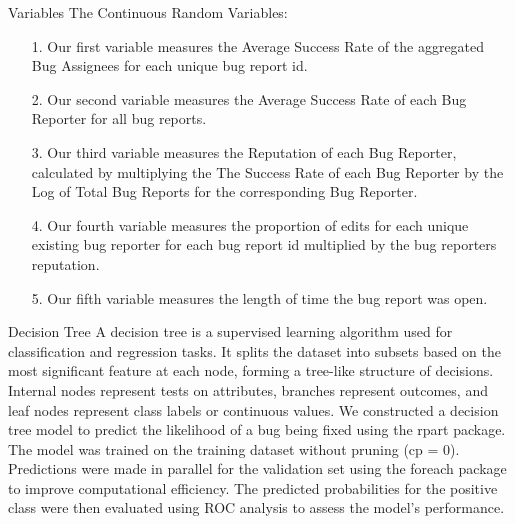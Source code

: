 \documentclass[10pt]{beamer}
\begin{document}
\begin{frame}[t]{Variables} \justifying \vspace{25pt}
	The Continuous Random Variables:
	\begin{enumerate}
	\item [1.] Our first variable measures the Average Success Rate of the aggregated Bug Assignees for each unique bug report id.
	\item [2.] Our second variable measures the Average Success Rate of each Bug Reporter for all bug reports.
	\item [3.] Our third variable measures the Reputation of each Bug Reporter, calculated by multiplying the The Success Rate of each Bug Reporter by the Log of Total Bug Reports for the corresponding Bug Reporter.
	\item [4.] Our fourth variable measures the proportion of edits for each unique existing bug reporter for each bug report id multiplied by the bug reporters reputation.
	\item [5.] Our fifth variable measures the length of time the bug report was open. 
	\end{enumerate}
\end{frame}


\begin{frame}[t]{Decision Tree}\justifying \vspace{10pt}
	A decision tree is a supervised learning algorithm used for classification and regression tasks. It splits the dataset into subsets based on the most significant feature at each node, forming a tree-like structure of decisions. Internal nodes represent tests on attributes, branches represent outcomes, and leaf nodes represent class labels or continuous values. 
	\vskip 8pt
	We constructed a decision tree model to predict the likelihood of a bug being fixed using the rpart package. The model was trained on the training dataset without pruning (cp = 0). Predictions were made in parallel for the validation set using the foreach package to improve computational efficiency. The predicted probabilities for the positive class were then evaluated using ROC analysis to assess the model's performance.
\end{frame}
\end{document}
